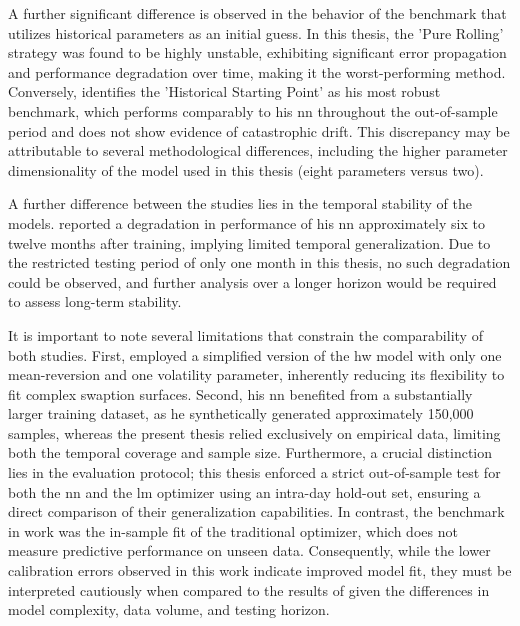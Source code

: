 A further significant difference is observed in the behavior of the benchmark that utilizes historical parameters as an initial guess. In this thesis, the 'Pure Rolling' strategy was found to be highly unstable, exhibiting significant error propagation and performance degradation over time, making it the worst-performing method. Conversely, \textcite{hernandez2016model} identifies the 'Historical Starting Point' as his most robust benchmark, which performs comparably to his \ac{nn} throughout the out-of-sample period and does not show evidence of catastrophic drift. This discrepancy may be attributable to several methodological differences, including the higher parameter dimensionality of the model used in this thesis (eight parameters versus two).

A further difference between the studies lies in the temporal stability of the models. \textcite{hernandez2016model} reported a degradation in performance of his \ac{nn} approximately six to twelve months after training, implying limited temporal generalization. Due to the restricted testing period of only one month in this thesis, no such degradation could be observed, and further analysis over a longer horizon would be required to assess long-term stability.

It is important to note several limitations that constrain the comparability of both studies. First, \textcite{hernandez2016model} employed a simplified version of the \ac{hw} model with only one mean-reversion and one volatility parameter, inherently reducing its flexibility to fit complex swaption surfaces. Second, his \ac{nn} benefited from a substantially larger training dataset, as he synthetically generated approximately 150,000 samples, whereas the present thesis relied exclusively on empirical data, limiting both the temporal coverage and sample size. Furthermore, a crucial distinction lies in the evaluation protocol; this thesis enforced a strict out-of-sample test for both the \ac{nn} and the \ac{lm} optimizer using an intra-day hold-out set, ensuring a direct comparison of their generalization capabilities. In contrast, the benchmark in \textcite{hernandez2016model} work was the in-sample fit of the traditional optimizer, which does not measure predictive performance on unseen data. Consequently, while the lower calibration errors observed in this work indicate improved model fit, they must be interpreted cautiously when compared to the results of \textcite{hernandez2016model} given the differences in model complexity, data volume, and testing horizon.

